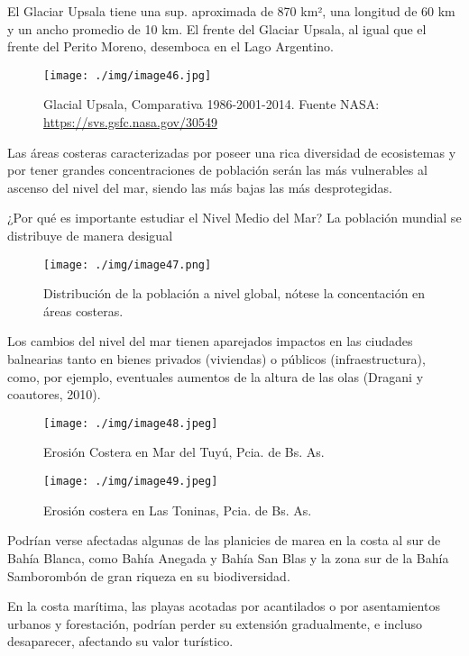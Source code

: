 \documentclass[
  a4paper,12pt]{extarticle}
\begin{document}
El Glaciar Upsala tiene una sup. aproximada de 870 km², una longitud de
60 km y un ancho promedio de 10 km. El frente del Glaciar Upsala, al
igual que el frente del Perito Moreno, desemboca en el Lago Argentino.

\begin{figure}
\centering
\texttt{[image: ./img/image46.jpg]}
\caption{Glacial Upsala, Comparativa 1986-2001-2014. Fuente NASA:
\url{https://svs.gsfc.nasa.gov/30549}}
\end{figure}

Las áreas costeras caracterizadas por poseer una rica diversidad de
ecosistemas y por tener grandes concentraciones de población serán las
más vulnerables al ascenso del nivel del mar, siendo las más bajas las
más desprotegidas.

¿Por qué es importante estudiar el Nivel Medio del Mar? La población
mundial se distribuye de manera desigual

\begin{figure}
\centering
\texttt{[image: ./img/image47.png]}
\caption{Distribución de la población a nivel global, nótese la
concentación en áreas costeras.}
\end{figure}

Los cambios del nivel del mar tienen aparejados impactos en las ciudades
balnearias tanto en bienes privados (viviendas) o públicos
(infraestructura), como, por ejemplo, eventuales aumentos de la altura
de las olas (Dragani y coautores, 2010).

\begin{figure}
\centering
\texttt{[image: ./img/image48.jpeg]}
\caption{Erosión Costera en Mar del Tuyú, Pcia. de Bs. As.}
\end{figure}

\begin{figure}
\centering
\texttt{[image: ./img/image49.jpeg]}
\caption{Erosión costera en Las Toninas, Pcia. de Bs. As.}
\end{figure}

Podrían verse afectadas algunas de las planicies de marea en la costa al
sur de Bahía Blanca, como Bahía Anegada y Bahía San Blas y la zona sur
de la Bahía Samborombón de gran riqueza en su biodiversidad.

En la costa marítima, las playas acotadas por acantilados o por
asentamientos urbanos y forestación, podrían perder su extensión
gradualmente, e incluso desaparecer, afectando su valor turístico.
\end{document}
